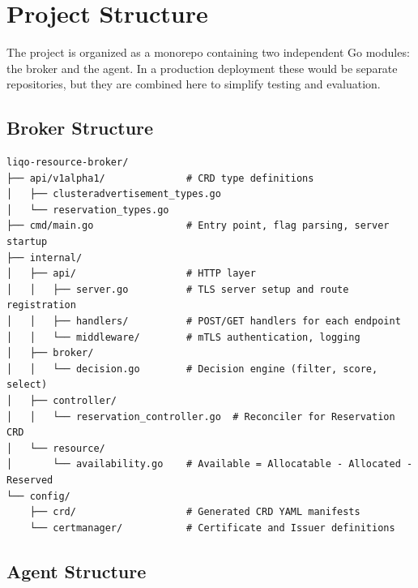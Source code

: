 \section{Project Structure}
\label{sec:project-structure}

The project is organized as a monorepo containing two independent Go modules: the broker and the agent. In a production deployment these would be separate repositories, but they are combined here to simplify testing and evaluation.

\subsection{Broker Structure}

\begin{verbatim}
liqo-resource-broker/
├── api/v1alpha1/              # CRD type definitions
│   ├── clusteradvertisement_types.go
│   └── reservation_types.go
├── cmd/main.go                # Entry point, flag parsing, server startup
├── internal/
│   ├── api/                   # HTTP layer
│   │   ├── server.go          # TLS server setup and route registration
│   │   ├── handlers/          # POST/GET handlers for each endpoint
│   │   └── middleware/        # mTLS authentication, logging
│   ├── broker/
│   │   └── decision.go        # Decision engine (filter, score, select)
│   ├── controller/
│   │   └── reservation_controller.go  # Reconciler for Reservation CRD
│   └── resource/
│       └── availability.go    # Available = Allocatable - Allocated - Reserved
└── config/
    ├── crd/                   # Generated CRD YAML manifests
    └── certmanager/           # Certificate and Issuer definitions
\end{verbatim}

\subsection{Agent Structure}

